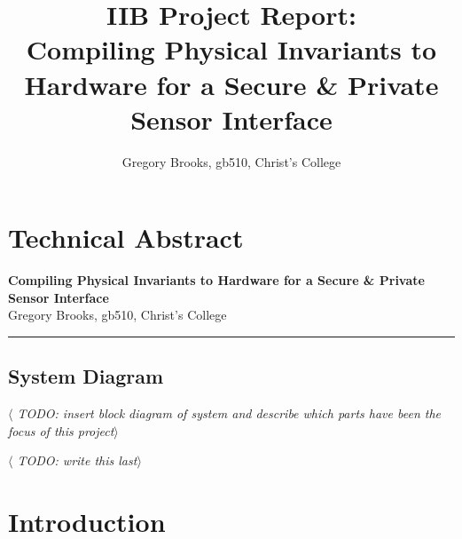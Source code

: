 \documentclass[12pt]{article}
\begin{document}

\clearpage \mbox{}
\clearpage
{}

\noindent

%
%

\title
{
  IIB Project Report:\\
  Compiling Physical Invariants to Hardware for a Secure \& Private Sensor Interface\\
}
\author{Gregory Brooks, gb510, Christ's College}
\date{}
\maketitle

\tableofcontents

\clearpage
{}

%
%
\pagestyle{technical_abstract}
\section{Technical Abstract}

\begin{center}
{
  \bf Compiling Physical Invariants to Hardware for a Secure \& Private Sensor Interface\\
}
Gregory Brooks, gb510, Christ's College
\end{center}
\rule{15.7cm}{0.5mm}
\vspace{1cm}


  \subsection{System Diagram}
    \textit{$\langle$ TODO: insert block diagram of system and describe which parts have been the focus of this project$\rangle$}

  \textit{$\langle$ TODO: write this last$\rangle$}

\newpage


\pagestyle{default}
%
%

\section{Introduction}

\newpage



%
%
\end{document}
